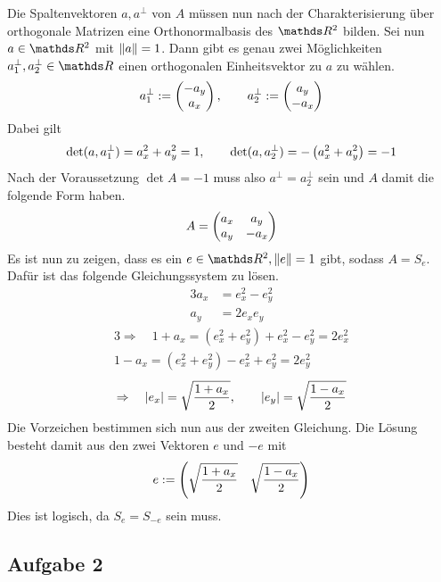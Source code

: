 			Die Spaltenvektoren $a,a^\perp$ von $A$ müssen nun nach der Charakterisierung über orthogonale Matrizen eine Orthonormalbasis des $\SR^2$ bilden.
			Sei nun $a\in\SR^2$ mit $\left\| a \right\|=1$.
			Dann gibt es genau zwei Möglichkeiten $a_1^\perp,a_2^\perp\in\SR$ einen orthogonalen Einheitsvektor zu $a$ zu wählen.
			\[
				a_1^\perp := \left( 
					\begin{matrix}
						-a_y \\ a_x
					\end{matrix}
				 \right),
				\qquad
				a_2^\perp := \left( 
					\begin{matrix}
						a_y \\ -a_x
					\end{matrix}
				 \right)
			\]
			Dabei gilt
			\[ \det(a,a_1^\perp) = a_x^2 + a_y^2 = 1 ,\qquad \det(a,a_2^\perp) = -\left( a_x^2 + a_y^2 \right) = -1 \]
			Nach der Voraussetzung $\det A = -1$ muss also $a^\perp = a_2^\perp$ sein und $A$ damit die folgende Form haben.
			\[
				A = \left( 
					\begin{matrix}
						a_x & a_y \\ a_y & -a_x	
					\end{matrix}	
				 \right)
			\]
			Es ist nun zu zeigen, dass es ein $e\in\SR^2, \norm{e}=1$ gibt, sodass $A = S_e$.
			Dafür ist das folgende Gleichungssystem zu lösen.
			\begin{alignat*}{3}
				a_x &= e_x^2 - e_y^2 \\
				a_y &= 2e_xe_y
			\end{alignat*}
			\begin{alignat*}{3}
				\Rightarrow \quad 1+a_x = (e_x^2 + e_y^2) + e_x^2 - e_y^2 = 2e_x^2 \\
				1-a_x = (e_x^2 + e_y^2) - e_x^2 + e_y^2 = 2e_y^2
			\end{alignat*}
			\[ \Rightarrow \quad \left\vert e_x \right\vert = \sqrt{\frac{1+a_x}{2}},\qquad \left\vert e_y \right\vert = \sqrt{\frac{1-a_x}{2}} \]
			Die Vorzeichen bestimmen sich nun aus der zweiten Gleichung.
			Die Lösung besteht damit aus den zwei Vektoren $e$ und $-e$ mit
			\[ e := \left(  \sqrt{\frac{1+a_x}{2}} \quad \sqrt{\frac{1-a_x}{2}}  \right) \]
			Dies ist logisch, da $S_e = S_{-e}$ sein muss. \qedbox



		\subsection*{Aufgabe 2} %
		\label{sub:aufgabe_2}
		
